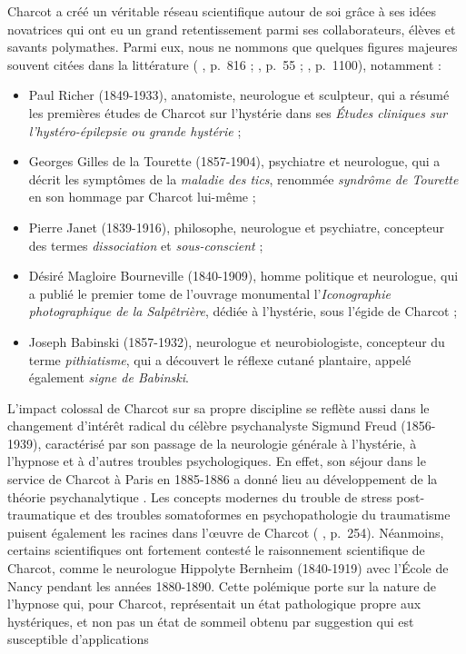 Charcot a créé un véritable réseau scientifique autour de soi grâce à ses idées novatrices qui ont eu un grand retentissement parmi ses collaborateurs, élèves et savants polymathes. Parmi eux, nous ne nommons que quelques figures majeures souvent citées dans la littérature (\citeauthor{gomes2013jean} \citeyear{gomes2013jean}, p.~816 ; \citeauthor{bogousslavsky2014mysteries} \citeyear{bogousslavsky2014mysteries}, p.~55 ; \citeauthor{camargo2024} \citeyear{camargo2024}, p.~1100), notamment :
\begin{itemize}
\item Paul Richer (1849-1933), anatomiste, neurologue et sculpteur, qui a résumé les premières études de Charcot sur l'hystérie dans ses \textit{Études cliniques sur l'hystéro-épilepsie ou grande hystérie} ;
\item Georges Gilles de la Tourette (1857-1904), psychiatre et neurologue, qui a décrit les symptômes de la \textit{maladie des tics}, renommée \textit{syndrôme de Tourette} en son hommage par Charcot lui-même ;
\item Pierre Janet (1839-1916), philosophe, neurologue et psychiatre, concepteur des termes \textit{dissociation} et \textit{sous-conscient} ;
\item Désiré Magloire Bourneville (1840-1909), homme politique et neurologue, qui a publié le premier tome de l'ouvrage monumental l'\textit{Iconographie photographique de la Salpêtrière}, dédiée à l'hystérie, sous l'égide de Charcot ; 
\item Joseph Babinski (1857-1932), neurologue et neurobiologiste, concepteur du terme \textit{pithiatisme}, qui a découvert le réflexe cutané plantaire, appelé également \textit{signe de Babinski}.
\end{itemize}
\bigskip
L'impact colossal de Charcot sur sa propre discipline se reflète aussi dans le changement d'intérêt radical du célèbre psychanalyste Sigmund Freud (1856-1939), caractérisé par son passage de la neurologie générale à l'hystérie, à l'hypnose et à d'autres troubles psychologiques. En effet, son séjour dans le service de Charcot à Paris en 1885-1886 a donné lieu au développement de la théorie psychanalytique \citep[p.~41]{camargo2018jean}. Les concepts modernes du trouble de stress post-traumatique et des troubles somatoformes en psychopathologie du traumatisme puisent également les racines dans l'\oe{}uvre de Charcot (\citeauthor{white1997jean} \citeyear{white1997jean}, p.~254). Néanmoins, certains scientifiques ont fortement contesté le raisonnement scientifique de Charcot, comme le neurologue Hippolyte Bernheim (1840-1919) avec l'École de Nancy pendant les années 1880-1890. Cette polémique porte sur la nature de l'hypnose qui, pour Charcot, représentait un état pathologique propre aux hystériques, et non pas un état de sommeil obtenu par suggestion qui est susceptible d'applications

